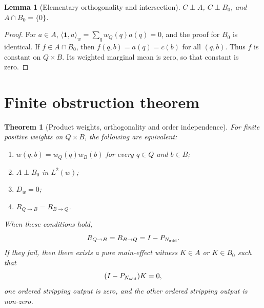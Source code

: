 \documentclass[11pt]{article}
\newtheorem{theorem}{Theorem}
\newtheorem{lemma}{Lemma}
\theoremstyle{remark}
\newcommand{\one}{\mathbf{1}}
\newcommand{\ip}[2]{\langle #1,#2\rangle_w}
\newcommand{\RQBt}{R_{Q\to B}}
\newcommand{\RBQt}{R_{B\to Q}}
\begin{document}
\begin{lemma}[Elementary orthogonality and intersection]
$C\perp A$, $C\perp B_0$, and $A\cap B_0=\{0\}$.
\end{lemma}

\begin{proof}
For $a\in A$, $\ip{\one}{a}=\sum_q w_Q(q)a(q)=0$, and the proof for $B_0$ is identical. If $f\in A\cap B_0$, then $f(q,b)=a(q)=c(b)$ for all $(q,b)$. Thus $f$ is constant on $Q\times B$. Its weighted marginal mean is zero, so that constant is zero.
\end{proof}

\section{Finite obstruction theorem}

\begin{theorem}[Product weights, orthogonality and order independence]
For finite positive weights on $Q\times B$, the following are equivalent:
\begin{enumerate}[label=(\roman*),leftmargin=*]
\item $w(q,b)=w_Q(q)w_B(b)$ for every $q\in Q$ and $b\in B$;
\item $A\perp B_0$ in $L^2(w)$;
\item $D_w=0$;
\item $\RQBt=\RBQt$.
\end{enumerate}
When these conditions hold,
\[
\RQBt=\RBQt=I-P_{N_{\rm add}}.
\]
If they fail, then there exists a pure main-effect witness $K\in A$ or $K\in B_0$ such that
\[
(I-P_{N_{\rm add}})K=0,
\]
one ordered stripping output is zero, and the other ordered stripping output is non-zero.
\end{theorem}
\end{document}
